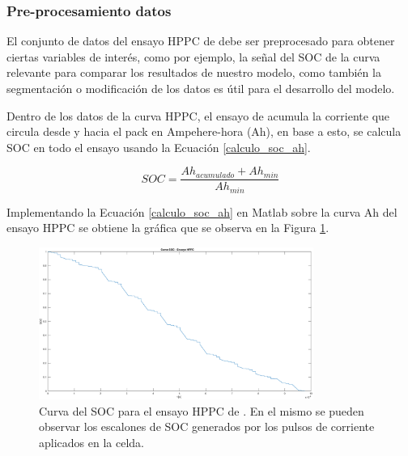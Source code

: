 \documentclass[10pt,a4paper]{article}
\newcounter{subsubsubsection}[subsubsection]
\begin{document}

\subsubsection{Pre-procesamiento datos}\label{data_preprocessing}

El conjunto de datos del ensayo \acrshort{HPPC} de \cite{Kollmeyer2018} debe ser
preprocesado para obtener ciertas variables de inter\'es, como por ejemplo, la
señal del \acrshort{SOC} de la curva relevante para comparar los resultados de
nuestro modelo, como tambi\'en la segmentaci\'on o modificaci\'on de los datos
es \'util para el desarrollo del modelo.


Dentro de los datos de la curva \acrshort{HPPC}, el ensayo de
\cite{Kollmeyer2018} acumula la corriente que circula desde y hacia el pack en
Ampehere-hora (Ah), en base a esto, se calcula \acrshort{SOC} en todo el ensayo
usando la Ecuaci\'on \ref{calculo_soc_ah}.

\begin{equation}
    SOC = \frac{Ah_{acumulado} + Ah_{min}}{Ah_{min}} \label{calculo_soc_ah}
\end{equation}

Implementando la Ecuaci\'on \ref{calculo_soc_ah} en Matlab sobre la curva Ah del
ensayo \acrshort{HPPC} se obtiene la gr\'afica que se observa en la Figura
\ref{soc_hppc_data}.

\begin{figure}[h!]
    \begin{center}
        \includegraphics[width=0.8\textwidth]{soc_hppc_data.eps}
        \caption{Curva del \acrshort{SOC} para el ensayo HPPC de
        \cite{Kollmeyer2018}. En el mismo se pueden observar los escalones de
        \acrshort{SOC} generados por los pulsos de corriente aplicados en la
        celda.}
        \label{soc_hppc_data}
    \end{center}
\end{figure}
\FloatBarrier
\end{document}
